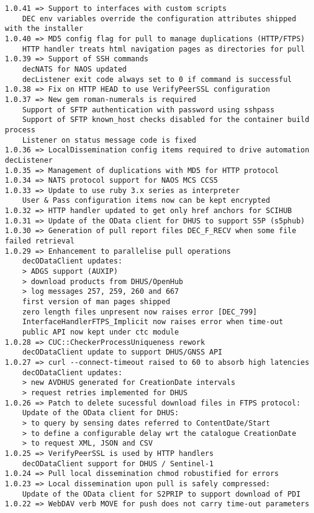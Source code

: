 \documentclass[dec_sum_main.tex]{subfiles}
\begin{document}
\begin{Verbatim}[tabsize=4]
    1.0.41 => Support to interfaces with custom scripts
    DEC env variables override the configuration attributes shipped with the installer
1.0.40 => MD5 config flag for pull to manage duplications (HTTP/FTPS)
    HTTP handler treats html navigation pages as directories for pull
1.0.39 => Support of SSH commands
    decNATS for NAOS updated
    decListener exit code always set to 0 if command is successful
1.0.38 => Fix on HTTP HEAD to use VerifyPeerSSL configuration
1.0.37 => New gem roman-numerals is required
    Support of SFTP authentication with password using sshpass
    Support of SFTP known_host checks disabled for the container build process
    Listener on status message code is fixed
1.0.36 => LocalDissemination config items required to drive automation decListener
1.0.35 => Management of duplications with MD5 for HTTP protocol
1.0.34 => NATS protocol support for NAOS MCS CCS5
1.0.33 => Update to use ruby 3.x series as interpreter
    User & Pass configuration items now can be kept encrypted
1.0.32 => HTTP handler updated to get only href anchors for SCIHUB
1.0.31 => Update of the OData client for DHUS to support S5P (s5phub)
1.0.30 => Generation of pull report files DEC_F_RECV when some file failed retrieval
1.0.29 => Enhancement to parallelise pull operations
    decODataClient updates:
    > ADGS support (AUXIP)
    > download products from DHUS/OpenHub
    > log messages 257, 259, 260 and 667
    first version of man pages shipped
    zero length files unpresent now raises error [DEC_799]
    InterfaceHandlerFTPS_Implicit now raises error when time-out
    public API now kept under ctc module
1.0.28 => CUC::CheckerProcessUniqueness rework
    decODataClient update to support DHUS/GNSS API
1.0.27 => curl --connect-timeout raised to 60 to absorb high latencies
    decODataClient updates:
    > new AVDHUS generated for CreationDate intervals
    > request retries implemented for DHUS
1.0.26 => Patch to delete sucessful download files in FTPS protocol:
    Update of the OData client for DHUS:
    > to query by sensing dates referred to ContentDate/Start
    > to define a configurable delay wrt the catalogue CreationDate
    > to request XML, JSON and CSV
1.0.25 => VerifyPeerSSL is used by HTTP handlers
    decODataClient support for DHUS / Sentinel-1
1.0.24 => Pull local dissemination chmod robustified for errors
1.0.23 => Local dissemination upon pull is safely compressed:
    Update of the OData client for S2PRIP to support download of PDI
1.0.22 => WebDAV verb MOVE for push does not carry time-out parameters

\end{Verbatim}
\end{document}
